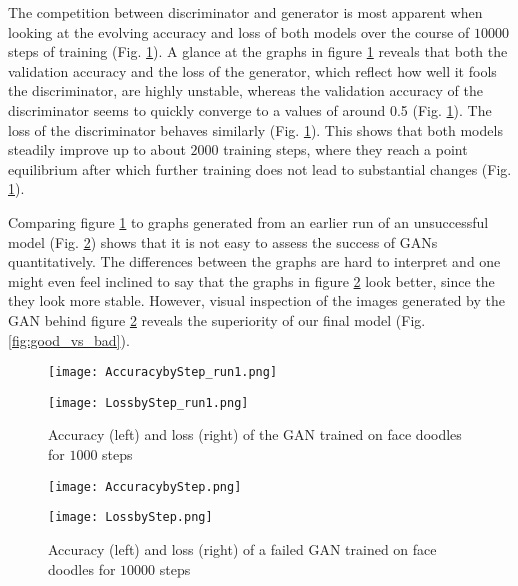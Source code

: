 \documentclass[11pt]{article}
\begin{document}
The competition between discriminator and generator is most apparent when looking at the evolving accuracy and loss of both models over the course of $10000$ steps of training (Fig. \ref{fig:acc_loss}). A glance at the graphs in figure \ref{fig:acc_loss} reveals that both the validation accuracy and the loss of the generator, which reflect how well it fools the discriminator, are highly unstable, whereas the validation accuracy of the discriminator seems to quickly converge to a values of around 0.5 (Fig. \ref{fig:acc_loss}). The loss of the discriminator behaves similarly (Fig. \ref{fig:acc_loss}). This shows that both models steadily improve up to about $2000$ training steps, where they reach a point equilibrium after which further training does not lead to substantial changes (Fig. \ref{fig:acc_loss}).

Comparing figure \ref{fig:acc_loss} to graphs generated from an earlier run of an unsuccessful model (Fig. \ref{fig:acc_loss_fail}) shows that it is not easy to assess the success of GANs quantitatively. The differences between the graphs are hard to interpret and one might even feel inclined to say that the graphs in figure \ref{fig:acc_loss_fail} look better, since the they look more stable. However, visual inspection of the images generated by the GAN behind figure \ref{fig:acc_loss_fail} reveals the superiority of our final model (Fig. \ref{fig:good_vs_bad}).

\begin{figure}[ht]
 \centering
 \begin{minipage}[b]{0.3\textwidth}
   \texttt{[image: AccuracybyStep\_run1.png]}
 \end{minipage}
   \begin{minipage}[b]{0.3\textwidth}
   \texttt{[image: LossbyStep\_run1.png]}
 \end{minipage}
 \caption{Accuracy (left) and loss (right) of the GAN trained on face doodles for $1000$ steps}
 \label{fig:acc_loss}
\end{figure}

\begin{figure}[ht]
 \centering
 \begin{minipage}[b]{0.3\textwidth}
   \texttt{[image: AccuracybyStep.png]}
 \end{minipage}
   \begin{minipage}[b]{0.3\textwidth}
   \texttt{[image: LossbyStep.png]}
 \end{minipage}
 \caption{Accuracy (left) and loss (right) of a failed GAN trained on face doodles for $10000$ steps}
 \label{fig:acc_loss_fail}
\end{figure}
\end{document}

